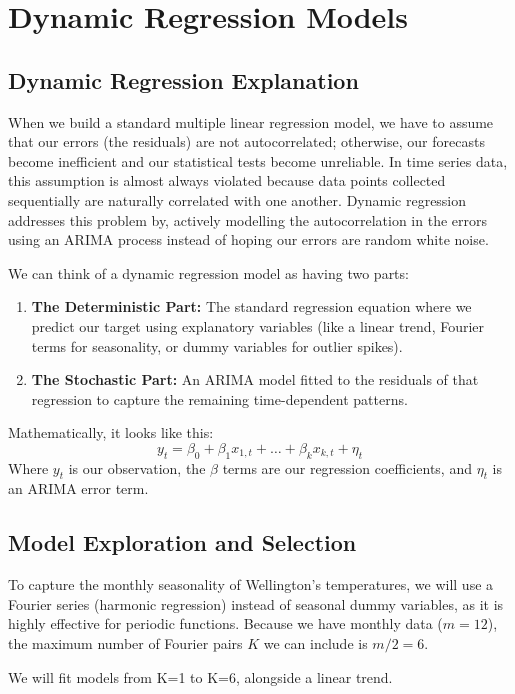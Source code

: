 \documentclass[11pt, a4paper]{article}\usepackage[]{graphicx}\usepackage[]{xcolor}
\begin{document}
\section{Dynamic Regression Models}

\subsection{Dynamic Regression Explanation}
When we build a standard multiple linear regression model, we have to assume that our errors (the residuals) are not autocorrelated; otherwise, our forecasts become inefficient and our statistical tests become unreliable. In time series data, this assumption is almost always violated because data points collected sequentially are naturally correlated with one another. Dynamic regression addresses this problem by, actively modelling the autocorrelation in the errors using an ARIMA process instead of hoping our errors are random white noise. 

We can think of a dynamic regression model as having two parts:
\begin{enumerate}
    \item \textbf{The Deterministic Part:} The standard regression equation where we predict our target using explanatory variables (like a linear trend, Fourier terms for seasonality, or dummy variables for outlier spikes).
    \item \textbf{The Stochastic Part:} An ARIMA model fitted to the residuals of that regression to capture the remaining time-dependent patterns.
\end{enumerate}

Mathematically, it looks like this:
$$y_t = \beta_0 + \beta_1 x_{1,t} + \dots + \beta_k x_{k,t} + \eta_t$$
Where $y_t$ is our observation, the $\beta$ terms are our regression coefficients, and $\eta_t$ is an ARIMA error term.

\subsection{Model Exploration and Selection}
To capture the monthly seasonality of Wellington's temperatures, we will use a Fourier series (harmonic regression) instead of seasonal dummy variables, as it is highly effective for periodic functions. Because we have monthly data ($m=12$), the maximum number of Fourier pairs $K$ we can include is $m/2 = 6$. 

We will fit models from K=1 to K=6, alongside a linear trend.
\end{document}
